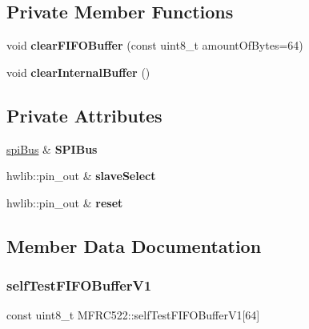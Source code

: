 \subsection*{Private Member Functions}
\begin{DoxyCompactItemize}
\item 
\mbox{\label{class_m_f_r_c522_a0fa1703360d0c741cf915b22e26c2631}} 
void {\bfseries clear\+F\+I\+F\+O\+Buffer} (const uint8\+\_\+t amount\+Of\+Bytes=64)
\item 
\mbox{\label{class_m_f_r_c522_a9d2c5ad7b977944e8bcbbcc9c1bb9b75}} 
void {\bfseries clear\+Internal\+Buffer} ()
\end{DoxyCompactItemize}
\subsection*{Private Attributes}
\begin{DoxyCompactItemize}
\item 
\mbox{\label{class_m_f_r_c522_a76b0186fcad01aafd3d7d7ae4da6a68c}} 
\mbox{\hyperlink{classspi_bus}{spi\+Bus}} \& {\bfseries S\+P\+I\+Bus}
\item 
\mbox{\label{class_m_f_r_c522_ab945c275a8644e226def9f3eee6698a2}} 
hwlib\+::pin\+\_\+out \& {\bfseries slave\+Select}
\item 
\mbox{\label{class_m_f_r_c522_a924c7dced5cb615461a0c9f353076407}} 
hwlib\+::pin\+\_\+out \& {\bfseries reset}
\end{DoxyCompactItemize}


\subsection{Member Data Documentation}
\mbox{\label{class_m_f_r_c522_a7d19c9869a7fbbe0d9825d5653d6af7b}} 
\subsubsection{\texorpdfstring{self\+Test\+F\+I\+F\+O\+Buffer\+V1}{selfTestFIFOBufferV1}}
{\footnotesize\ttfamily const uint8\+\_\+t M\+F\+R\+C522\+::self\+Test\+F\+I\+F\+O\+Buffer\+V1\mbox{[}64\mbox{]}}

